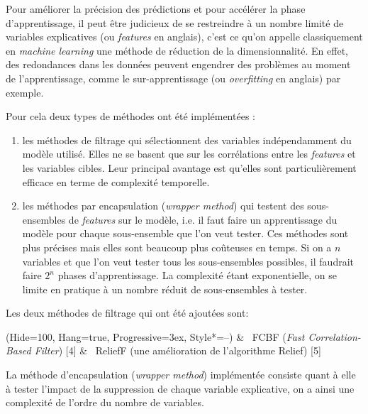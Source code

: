 Pour améliorer la précision des prédictions et pour accélérer la phase d’apprentissage, il peut être judicieux de se restreindre à un nombre limité de variables explicatives (ou \textit{features} en anglais), c’est ce qu’on appelle classiquement en \textit{machine learning} une méthode de réduction de la dimensionnalité. En effet, des redondances dans les données peuvent engendrer des problèmes au moment de l’apprentissage, comme le sur-apprentissage (ou \textit{overfitting} en anglais) par exemple.

Pour cela deux types de méthodes ont été implémentées : 
\begin{enumerate}
\item les méthodes de filtrage qui sélectionnent des variables indépendamment du modèle utilisé. Elles ne se basent que sur les corrélations entre les \textit{features} et les variables cibles. Leur principal avantage est qu’elles sont particulièrement efficace en terme de complexité temporelle.
\item les méthodes par encapsulation (\textit{wrapper method}) qui testent des sous-ensembles de \textit{features} sur le modèle, i.e. il faut faire un apprentissage du modèle pour chaque sous-ensemble que l’on veut tester. Ces méthodes sont plus précises mais elles sont beaucoup plus coûteuses en temps. Si on a $n$ variables et que l’on veut tester tous les sous-ensembles possibles, il faudrait faire $2^{n}$ phases d’apprentissage. La complexité étant exponentielle, on se limite en pratique à un nombre réduit de sous-ensembles à tester.
\end{enumerate}

Les deux méthodes de filtrage qui ont été ajoutées sont:
\begin{easylist}
\ListProperties(Hide=100, Hang=true, Progressive=3ex, Style*=--)
& ~FCBF (\textit{Fast Correlation-Based Filter}) [4]
& ~ReliefF (une amélioration de l’algorithme Relief) [5] 
\end{easylist}

La méthode d’encapsulation (\textit{wrapper method}) implémentée consiste quant à elle à tester l’impact de la suppression de chaque variable explicative, on a ainsi une complexité de l’ordre du nombre de variables.

